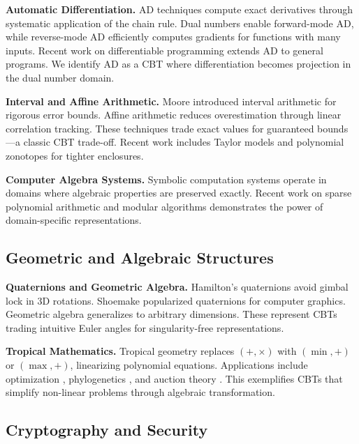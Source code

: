 \documentclass[11pt]{article}
\theoremstyle{definition}
\begin{document}
\textbf{Automatic Differentiation.} AD techniques compute exact derivatives through systematic application of the chain rule. Dual numbers \cite{clifford1873preliminary} enable forward-mode AD, while reverse-mode AD \cite{griewank2008evaluating} efficiently computes gradients for functions with many inputs. Recent work on differentiable programming \cite{baydin2017automatic} extends AD to general programs. We identify AD as a CBT where differentiation becomes projection in the dual number domain.

\textbf{Interval and Affine Arithmetic.} Moore \cite{moore1966interval} introduced interval arithmetic for rigorous error bounds. Affine arithmetic \cite{de2004affine} reduces overestimation through linear correlation tracking. These techniques trade exact values for guaranteed bounds—a classic CBT trade-off. Recent work includes Taylor models \cite{makino2003taylor} and polynomial zonotopes \cite{althoff2013reachability} for tighter enclosures.

\textbf{Computer Algebra Systems.} Symbolic computation systems \cite{cohen2003computer} operate in domains where algebraic properties are preserved exactly. Recent work on sparse polynomial arithmetic \cite{monagan2019sirocco} and modular algorithms \cite{dahan2006modular} demonstrates the power of domain-specific representations.

\subsection{Geometric and Algebraic Structures}

\textbf{Quaternions and Geometric Algebra.} Hamilton's quaternions \cite{hamilton1844quaternions} avoid gimbal lock in 3D rotations. Shoemake \cite{shoemake1985animating} popularized quaternions for computer graphics. Geometric algebra \cite{dorst2009geometric} generalizes to arbitrary dimensions. These represent CBTs trading intuitive Euler angles for singularity-free representations.

\textbf{Tropical Mathematics.} Tropical geometry \cite{maclagan2015introduction} replaces $(+, \times)$ with $(\min, +)$ or $(\max, +)$, linearizing polynomial equations. Applications include optimization \cite{butkovivc2010max}, phylogenetics \cite{pachter2004tropical}, and auction theory \cite{baldwin2019tropical}. This exemplifies CBTs that simplify non-linear problems through algebraic transformation.

\subsection{Cryptography and Security}
\end{document}
